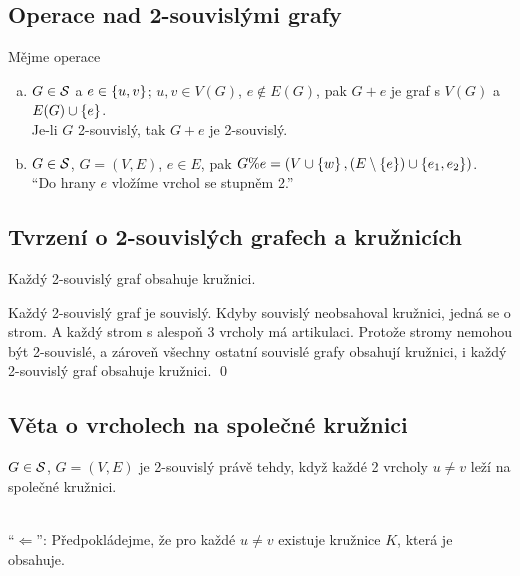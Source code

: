 \subsection{Operace nad 2-souvislými grafy}
Mějme operace
\begin{enumerate}[(a)]
    \item $G \in \S$ a $e \in \bc{u,v}$; $u, v \in V(G)$, $e \not\in E(G)$, pak
    $G + e$ je graf s $V(G)$ a $E(G) \cup \bc{e}$. \\ Je-li $G$ 2-souvislý, tak $G+e$ je 2-souvislý.
    \item $G \in \S$, $G = (V,E)$, $e \in E$, pak
    $G \% e = \left(V \cup \bc{w}, (E \setminus \bc{e}) \cup \bc{e_1, e_2}\right)$. \\
    \enquote{Do hrany $e$ vložíme vrchol se stupněm 2.}
\end{enumerate}

\subsection{Tvrzení o 2-souvislých grafech a kružnicích}
Každý 2-souvislý graf obsahuje kružnici. 

 Každý 2-souvislý graf je souvislý. Kdyby souvislý neobsahoval kružnici, jedná se o strom. A každý strom s 
alespoň 3 vrcholy má artikulaci. Protože stromy nemohou být 2-souvislé, a zároveň všechny ostatní souvislé grafy 
obsahují kružnici, i každý 2-souvislý graf obsahuje kružnici.
\hspace{\fill}\qed

\subsection{Věta o vrcholech na společné kružnici}
$G \in \S$, $G = (V,E)$ je 2-souvislý právě tehdy, když každé 2 vrcholy $u \not= v$ leží na společné kružnici.

\\
\enquote{$\Leftarrow$}: Předpokládejme, že pro každé $u \not= v$ existuje kružnice $K$, která je obsahuje.

